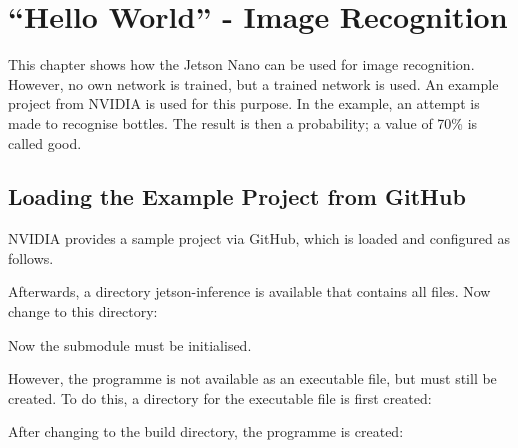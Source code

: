 %
%

\chapter{``Hello World'' - Image Recognition}


This chapter shows how the Jetson Nano can be used for image recognition. However, no own network is trained, but a trained network is used. An example project from NVIDIA is used for this purpose. In the example, an attempt is made to recognise bottles. The result is then a probability; a value of 70\% is called good. 



\section{Loading the Example Project from GitHub}

NVIDIA provides a sample project via GitHub, which is loaded and configured as follows.

\medskip



\medskip

Afterwards, a directory jetson-inference is available that contains all files. Now change to this directory:

\medskip


\medskip

Now the submodule must be initialised.

\medskip


\medskip

However, the programme is not available as an executable file, but must still be created. To do this, a directory for the executable file is first created:

\medskip


\medskip

After changing to the build directory, the programme is created:

